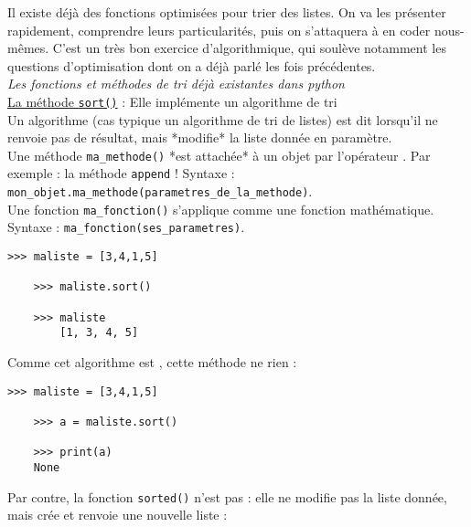 


Il existe déjà des fonctions optimisées pour trier des listes. On va les présenter rapidement, comprendre leurs particularités, puis on s'attaquera à en coder nous-mêmes. C'est un très bon exercice d'algorithmique, qui soulève notamment les questions d'optimisation dont on a déjà parlé les fois précédentes. \\



\textit{Les fonctions et méthodes de tri déjà existantes dans python}\\

\nipuce \ul{La méthode \texttt{sort()}} : Elle implémente un algorithme de tri \\
 Un algorithme (cas typique un algorithme de tri de listes) est dit  lorsqu'il ne renvoie pas de résultat, mais *modifie* la liste donnée en paramètre. \\
 Une méthode \texttt{ma\_methode()} *est attachée* à un objet par l'opérateur . Par exemple : la méthode \texttt{append} ! Syntaxe : \texttt{mon\_objet.ma\_methode(parametres\_de\_la\_methode)}. \\
Une fonction \texttt{ma\_fonction()} s'applique comme une fonction mathématique. Syntaxe : \texttt{ma\_fonction(ses\_parametres)}.

\begin{Verbatim}[tabsize=4]
	>>> maliste = [3,4,1,5]

	>>> maliste.sort()

	>>> maliste
		[1, 3, 4, 5]
\end{Verbatim}

Comme cet algorithme est , cette méthode ne  rien :
\begin{Verbatim}[tabsize=4]
	>>> maliste = [3,4,1,5]

	>>> a = maliste.sort()

	>>> print(a)
	None
\end{Verbatim}

\nipuce  Par contre, la fonction \texttt{sorted()} n'est pas  : elle ne modifie pas la liste donnée, mais crée et renvoie une nouvelle liste :

